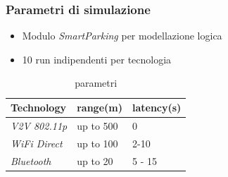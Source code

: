 \documentclass{beamer}
\begin{document}
\begin{frame}
\frametitle{Parametri di simulazione}
\begin{itemize}
\item Modulo \textit{SmartParking} per modellazione logica
\item 10 run indipendenti per tecnologia
\end{itemize}
\begin{table}
\begin{tabular}{l l l}
\toprule
\textbf{Technology} & \textbf{range(m)} & \textbf{latency(s)}\\
\midrule
\textit{V2V 802.11p} & up to 500 & 0 \\
\textit{WiFi Direct} & up to 100 & 2-10 \\
\textit{Bluetooth}  & up to 20 & 5 - 15 \\
\bottomrule
\end{tabular}
\caption{parametri}
\end{table}
\end{frame}
\end{document}
